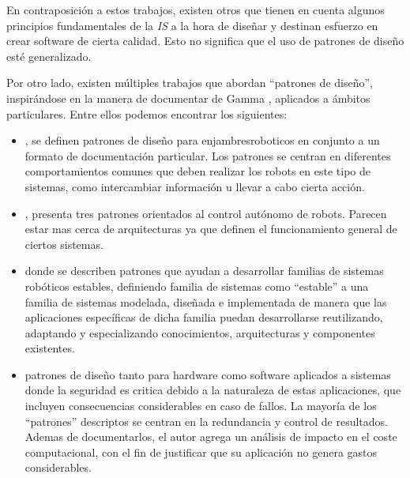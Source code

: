 En contraposición a estos trabajos, existen otros \cite{good-desing-agrobot,good-desing-street} que tienen en cuenta algunos principios fundamentales de la \textit{IS} a la hora de diseñar y destinan esfuerzo en crear software de cierta calidad. Esto no significa que el uso de patrones de diseño esté generalizado.

Por otro lado, existen múltiples trabajos que abordan ``patrones de diseño'',  inspirándose en la manera de documentar de Gamma \cite{Gamma:1995:DPE:186897}, aplicados a ámbitos particulares. Entre ellos podemos encontrar los siguientes:

\begin{itemize}
\item \cite{enjambre}, se definen patrones de diseño para \gls{enjambresroboticos} en conjunto a un formato de documentación particular. Los patrones se centran en diferentes comportamientos comunes que deben realizar los robots en este tipo de sistemas, como intercambiar información u llevar a cabo cierta acción.

\item \cite{patterns_2013}, presenta tres patrones orientados al control autónomo de robots. Parecen estar mas cerca de arquitecturas ya que definen el funcionamiento general de ciertos sistemas.

\item \cite{stable} donde se describen patrones que ayudan a desarrollar familias de sistemas robóticos estables, definiendo familia de sistemas como ``estable'' a una familia de sistemas modelada, diseñada e implementada de manera que las aplicaciones específicas de dicha familia puedan desarrollarse reutilizando, adaptando y especializando conocimientos, arquitecturas y componentes existentes.

\item \cite{critical} patrones de diseño tanto para hardware como software aplicados a sistemas donde la seguridad es critica debido a la naturaleza de estas aplicaciones, que incluyen consecuencias considerables en caso de fallos. La mayoría de los ``patrones'' descriptos se centran en la redundancia y control de resultados. Ademas de documentarlos, el autor agrega un análisis de impacto en el coste computacional, con el fin de justificar que su aplicación no genera gastos considerables.

\end{itemize}

